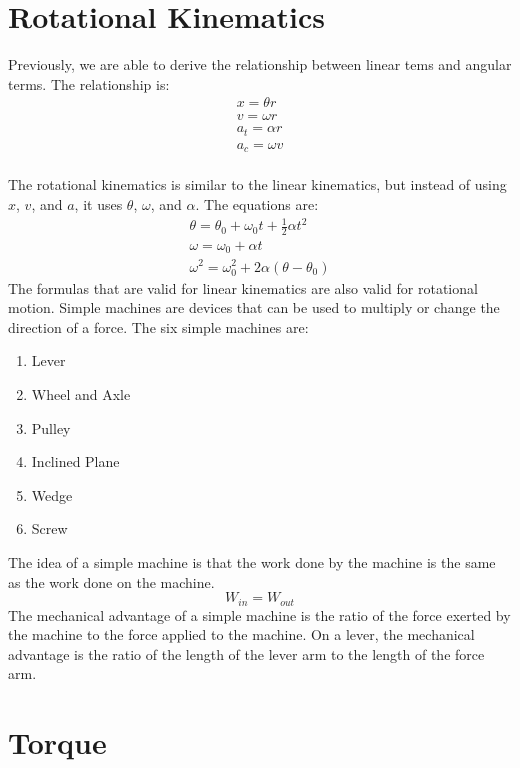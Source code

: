 \documentclass[]{article}
\begin{document}
    \section{Rotational Kinematics}
        Previously, we are able to derive the relationship between linear
        tems and angular terms. The relationship is:
        \begin{gather*}
            x = \theta r\\
            v = \omega r\\
            a_t = \alpha r\\
            a_c = \omega v\\
        \end{gather*}

        The rotational kinematics is similar to the linear kinematics, but
        instead of using $x$, $v$, and $a$, it uses $\theta$, $\omega$, and
        $\alpha$. The equations are:
        \begin{gather*}
            \theta = \theta_0 + \omega_0 t + \frac{1}{2} \alpha t^2\\
            \omega = \omega_0 + \alpha t\\
            \omega^2 = \omega_0^2 + 2\alpha(\theta - \theta_0)
        \end{gather*}
        The formulas that are valid for linear kinematics are also valid for
        rotational motion.
        Simple machines are devices that can be used to multiply or change
        the direction of a force. The six simple machines are:
        \begin{enumerate}
            \item Lever
            \item Wheel and Axle
            \item Pulley
            \item Inclined Plane
            \item Wedge
            \item Screw
        \end{enumerate}
        The idea of a simple machine is that the work done by the machine is the
        same as the work done on the machine.
        \[W_{in} = W_{out}\]
        The mechanical advantage of a
        simple machine is the ratio of the force exerted by the machine to the
        force applied to the machine. On a lever, the mechanical advantage is
        the ratio of the length of the lever arm to the length of the force
        arm.
    \section{Torque}
\end{document}
